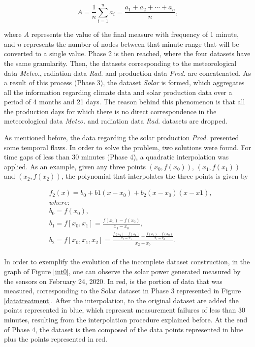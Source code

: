 \begin{equation}
     A={\frac {1}{n}}\sum _{i=1}^{n}a_{i}={\frac {a_{1}+a_{2}+\cdots +a_{n}}{n}},
\label{amean}
\end{equation}

where $A$ represents the value of the final measure with frequency of 1 minute, and $n$ represents the number of nodes between that minute range that will be converted to a single value. Phase 2 is then reached, where the four datasets have the same granularity. Then, the datasets corresponding to the meteorological data \textit{Meteo.}, radiation data \textit{Rad.} and production data \textit{Prod.} are concatenated. As a result of this process (Phase 3), the dataset \textit{Solar} is formed, which aggregates all the information regarding climate data and solar production data over a period of 4 months and 21 days. The reason behind this phenomenon is that all the production days for which there is no direct correspondence in the meteorological data \textit{Meteo.} and radiation data \textit{Rad.} datasets are dropped. 

As mentioned before, the data regarding the solar production \textit{Prod.} presented some temporal flaws. In order to solve the problem, two solutions were found. For time gaps of less than 30 minutes (Phase 4), a quadratic interpolation was applied. As an example, given any three points $(x_0, f(x_0))$, $(x_1, f(x_1))$ and $(x_2, f(x_2))$, the polynomial that interpolates the three points is given by

\begin{equation}
\begin{split}
     & f_2(x)=b_0+b1(x-x_0)+b_2(x-x_0)(x-x1),\\
     & where:\\
     & b_0=f(x_0),\\
     & b_1=f[x_0,x_1]=\frac{f(x_1)-f(x_0)}{x_1-x_0},\\
     & b_2=f[x_0,x_1,x_2]=\frac{\frac{f(x_2)-f(x_1)}{x_2-x_1}-\frac{f(x_1)-f(x_0)}{x_1-x_0}}{x_2-x_0}.\\
\end{split}
\label{poly}
\end{equation}


In order to exemplify the evolution of the incomplete dataset construction, in the graph of Figure \ref{int0}, one can observe the solar power generated measured by the sensors on February 24, 2020. In red, is the portion of data that was measured, corresponding to the Solar dataset in Phase 3 represented in Figure \ref{datatreatment}. After the interpolation, to the original dataset are added the points represented in blue, which represent measurement failures of less than 30 minutes, resulting from the interpolation procedure explained before. At the end of Phase 4, the dataset is then composed of the data points represented in blue plus the points represented in red.



